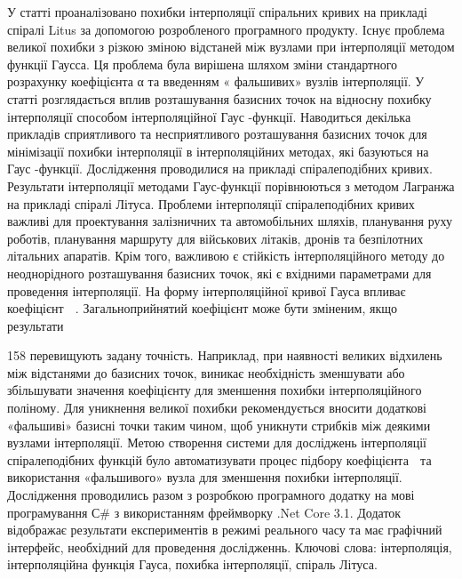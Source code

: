 \documentclass[12pt,a4paper]{article}
\begin{document}
У статті проаналізовано похибки інтерполяції спіральних кривих на прикладі спіралі Litus за допомогою розробленого програмного продукту. Існує проблема великої похибки з різкою зміною відстаней між вузлами при інтерполяції методом функції Гаусса. Ця проблема була вирішена шляхом зміни стандартного розрахунку коефіцієнта α та введенням « фальшивих» вузлів інтерполяції. У статті розглядається вплив розташування базисних точок на відносну похибку інтерполяції способом інтерполяційної Гаус -функції. Наводиться декілька прикладів сприятливого та несприятливого розташування базисних точок для мінімізації похибки інтерполяції в інтерполяційних методах, які базуються на Гаус -функції. Дослідження проводилися на прикладі спіралеподібних кривих. Результати інтерполяції методами Гаус-функції порівнюються з методом Лагранжа на прикладі спіралі Літуса. Проблеми інтерполяції спіралеподібних кривих важливі для проектування залізничних та автомобільних шляхів, планування руху роботів, планування маршруту для військових літаків, дронів та безпілотних літальних апаратів. Крім того, важливою є стійкість інтерполяційного методу до неоднорідного розташування базисних точок, які є вхідними параметрами для проведення інтерполяції. На форму інтерполяційної кривої Гауса впливає коефіцієнт  . Загальноприйнятий коефіцієнт може бути зміненим, якщо результати
\par
158 перевищують задану точність. Наприклад, при наявності великих відхилень між відстанями до базисних точок, виникає необхідність зменшувати або збільшувати значення коефіцієнту для зменшення похибки інтерполяційного поліному. Для уникнення великої похибки рекомендується вносити додаткові «фальшиві» базисні точки таким чином, щоб уникнути стрибків між деякими вузлами інтерполяції. Метою створення системи для досліджень інтерполяції спіралеподібних функцій було автоматизувати процес підбору коефіцієнта  та використання «фальшивого» вузла для зменшення похибки інтерполяції. Дослідження проводились разом з розробкою програмного додатку на мові програмування С\# з використанням фреймворку .Net Core 3.1. Додаток відображає результати експериментів в режимі реального часу та має графічний інтерфейс, необхідний для проведення дослідженнь. Ключові слова: інтерполяція, інтерполяційна функція Гауса, похибка інтерполяції, спіраль Літуса.
\par
\end{document}
